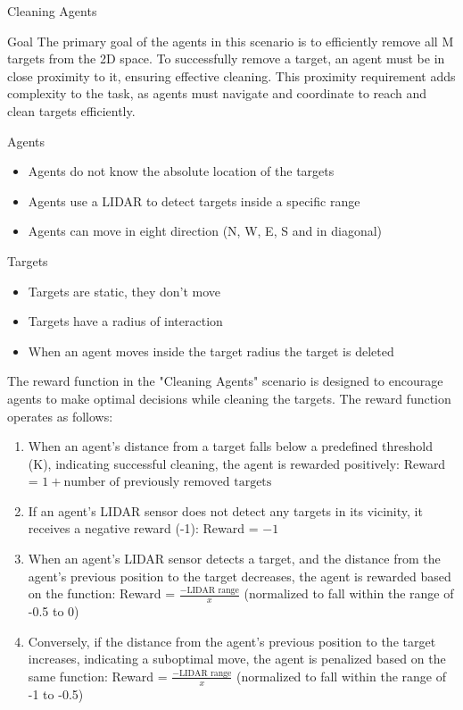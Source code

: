 \documentclass[presentation]{beamer}\mode<presentation>{\usetheme{AMSBolognaFC}}
\begin{document}
\begin{frame}[allowframebreaks]{Cleaning Agents}
	\begin{block}{Goal}
		The primary goal of the agents in this scenario is to efficiently remove all M targets from the 2D space. To successfully remove a target, an agent must be in close proximity to it, ensuring effective cleaning. This proximity requirement adds complexity to the task, as agents must navigate and coordinate to reach and clean targets efficiently.
	\end{block}
	\newpage
	\begin{block}{Agents}
		\begin{itemize}
			\item Agents do not know the absolute location of the targets
			\item Agents use a LIDAR to detect targets inside a specific range
			\item Agents can move in eight direction (N, W, E, S and in diagonal)
		\end{itemize}
	\end{block}
	\begin{block}{Targets}
		\begin{itemize}
			\item Targets are static, they don't move
			\item Targets have a radius of interaction
			\item When an agent moves inside the target radius the target is deleted
		\end{itemize}
	\end{block}
	\newpage
		The reward function in the "Cleaning Agents" scenario is 
		designed to encourage agents to make optimal decisions while cleaning 
		the targets. The reward function operates as follows:  
\begin{enumerate}
  \item When an agent's distance from a target falls below a predefined threshold (K), indicating successful cleaning, the agent is rewarded positively:
  Reward = $1 + \text{number of previously removed targets}$
  \item If an agent's LIDAR sensor does not detect any targets in its vicinity, it receives a negative reward (-1):
  Reward = $-1$
  \item When an agent's LIDAR sensor detects a target, and the distance from the agent's previous position to the target decreases, the agent is rewarded based on the function:
  Reward = $\frac{-\text{LIDAR range}}{x}$ (normalized to fall within the range of -0.5 to 0)
  \item Conversely, if the distance from the agent's previous position to the target increases, indicating a suboptimal move, the agent is penalized based on the same function:
  Reward = $\frac{-\text{LIDAR range}}{x}$ (normalized to fall within the range of -1 to -0.5)
\end{enumerate}
\end{frame}
\end{document}
